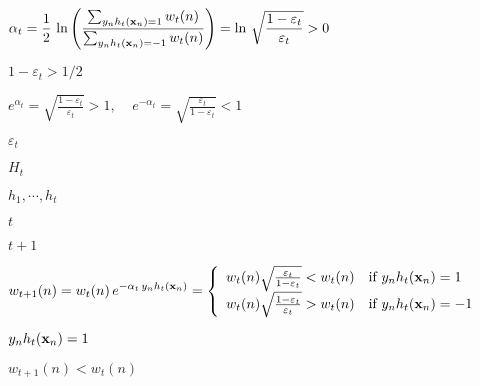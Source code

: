 \documentclass{article}
\def\lthtmlcheckvsize{\ifdim\ht\sizebox<\vsize 
  \ifdim\wd\sizebox<\hsize\expandafter\hfill\fi \expandafter\vfill
  \else\expandafter\vss\fi}%
\begin{document}
{\newpage\clearpage
{}%
$\displaystyle \alpha_t=\frac{1}{2}\,\ln \left(
\frac{\sum_{y_n h_t({\bf x}_n)=1} w_t(n)}{\sum_{y_n h_t({\bf x}_n)=-1} w_t(n)}\right)
=\ln\,\sqrt{\frac{1-\varepsilon_t}{\varepsilon_t}} > 0$%
\lthtmlindisplaymathZ
\lthtmlcheckvsize\clearpage}

{\newpage\clearpage
{}%
$ 1-\varepsilon_t>1/2$%
\lthtmlindisplaymathZ
\lthtmlcheckvsize\clearpage}

{\newpage\clearpage
{}%
$\displaystyle e^{\alpha_t}=\sqrt{\frac{1-\varepsilon_t}{\varepsilon_t}}>1,\;\;\;\;
e^{-\alpha_t}=\sqrt{\frac{\varepsilon_t}{1-\varepsilon_t}}<1$%
\lthtmlindisplaymathZ
\lthtmlcheckvsize\clearpage}

{\newpage\clearpage
{}%
$ \varepsilon_t$%
\lthtmlindisplaymathZ
\lthtmlcheckvsize\clearpage}

{\newpage\clearpage
{}%
$ H_t$%
\lthtmlindisplaymathZ
\lthtmlcheckvsize\clearpage}

{\newpage\clearpage
{}%
$ h_1,\cdots,h_t$%
\lthtmlindisplaymathZ
\lthtmlcheckvsize\clearpage}

{\newpage\clearpage
{}%
$ t$%
\lthtmlindisplaymathZ
\lthtmlcheckvsize\clearpage}

{\newpage\clearpage
{}%
$ t+1$%
\lthtmlindisplaymathZ
\lthtmlcheckvsize\clearpage}

{\newpage\clearpage
{}%
$\displaystyle w_{t+1}(n)=w_t(n)\,e^{-\alpha_t\,y_nh_t({\bf x}_n)}
=\left\{\begin{array}{ll}
w_t(n) \sqrt{\frac{\varepsilon_t}{1-\varepsilon_t}}<w_t(n) &
\mbox{if }y_n h_t({\bf x}_n)=1 \\
w_t(n) \sqrt{\frac{1-\varepsilon_t}{\varepsilon_t}}>w_t(n) &
\mbox{if }y_n h_t({\bf x}_n)=-1
\end{array}\right.$%
\lthtmlindisplaymathZ
\lthtmlcheckvsize\clearpage}

{\newpage\clearpage
{}%
$ y_nh_t({\bf x}_n)=1$%
\lthtmlindisplaymathZ
\lthtmlcheckvsize\clearpage}

{\newpage\clearpage
{}%
$ w_{t+1}(n)<w_t(n)$%
\lthtmlindisplaymathZ
\lthtmlcheckvsize\clearpage}
\end{document}
